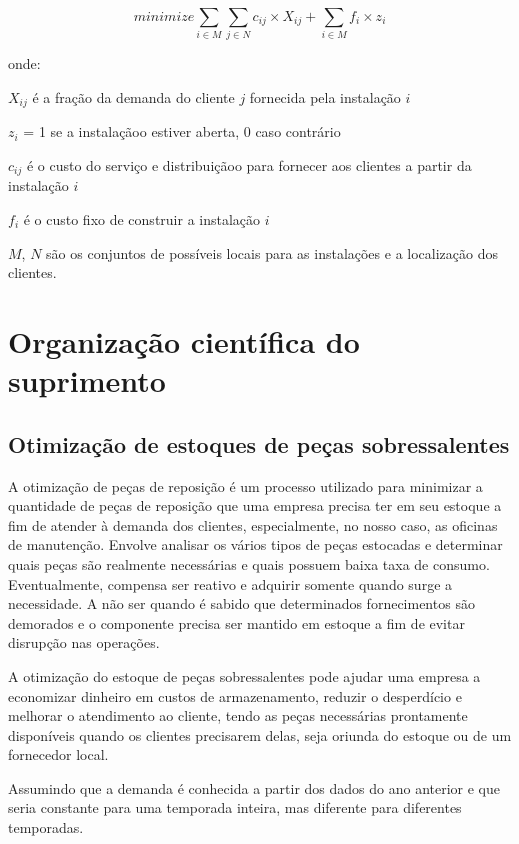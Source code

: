 \documentclass{article}
\begin{document}
\begin{equation} \label{eq:fo3}
minimize \sum_{i \in M} \sum_{j \in N} c_{ij} \times X_{ij} + \sum_{i \in M} f_i \times z_i
\end{equation}

onde:

$X_{ij}$ é a fração da demanda do cliente $j$ fornecida pela instalação $i$

$z_i$ = 1 se a instalaçãoo estiver aberta, 0 caso contrário

$c_{ij}$ é o custo do serviço e distribuiçãoo para fornecer aos clientes a partir da instalação $i$

$f_i$ é o custo fixo de construir a instalação $i$

$M$, $N$ são os conjuntos de possíveis locais para as instalações e a localização dos clientes.


\section{Organização científica do suprimento}


\subsection{Otimização de estoques de peças sobressalentes}

A otimização de peças de reposição é um processo utilizado para minimizar a quantidade de peças de reposição que uma empresa precisa ter em seu estoque a fim de atender à demanda dos clientes, especialmente, no nosso caso, as oficinas de manutenção. Envolve analisar os vários tipos de peças estocadas e determinar quais peças são realmente necessárias e quais possuem baixa taxa de consumo. Eventualmente, compensa ser reativo e adquirir somente quando surge a necessidade. A não ser quando é sabido que determinados fornecimentos são demorados e o componente precisa ser mantido em estoque a fim de evitar disrupção nas operações.

A otimização do estoque de peças sobressalentes pode ajudar uma empresa a economizar dinheiro em custos de armazenamento, reduzir o desperdício e melhorar o atendimento ao cliente, tendo as peças necessárias prontamente disponíveis quando os clientes precisarem delas, seja oriunda do estoque ou de um fornecedor local.

Assumindo que a demanda é conhecida a partir dos dados do ano anterior e que seria constante para uma temporada inteira, mas diferente para diferentes temporadas.
\end{document}
